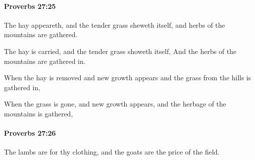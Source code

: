 		\paragraph{Proverbs 27:25} %
			\label{PROVERBS-27-25}

			The hay appeareth, and the tender grass sheweth itself, and herbs of the mountains are gathered.

			\begin{versebox}
					\item[BHS] 
					\item[ASV] The hay is carried, and the tender grass showeth itself, And the herbs of the mountains are gathered in.
					\item[NIV] When the hay is removed and new growth appears and the grass from the hills is gathered in,
					\item[NRSV] When the grass is gone, and new growth appears, and the herbage of the mountains is gathered,
			\end{versebox}

		\paragraph{Proverbs 27:26} %
			\label{PROVERBS-27-26}

			The lambs are for thy clothing, and the goats are the price of the field.

